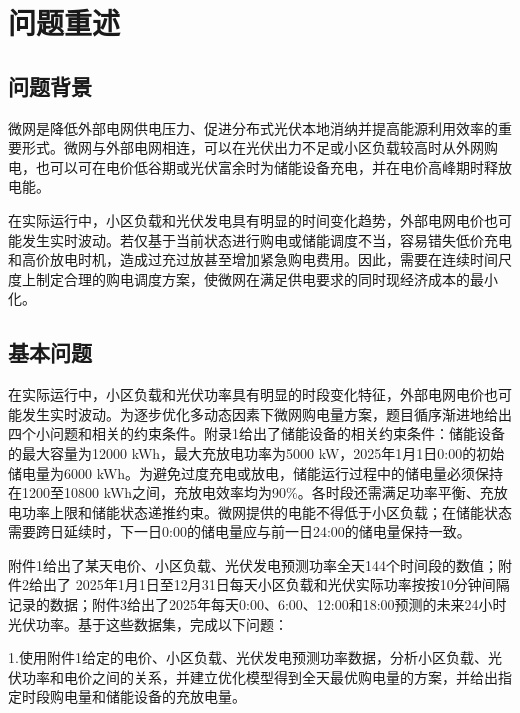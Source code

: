 \documentclass{cumcm2026}
\begin{document}
\label{cumcm:body-start}


\section{问题重述}

\subsection{问题背景}

微网是降低外部电网供电压力、促进分布式光伏本地消纳并提高能源利用效率的重要形式。微网与外部电网相连，可以在光伏出力不足或小区负载较高时从外网购电，也可以可在电价低谷期或光伏富余时为储能设备充电，并在电价高峰期时释放电能。

在实际运行中，小区负载和光伏发电具有明显的时间变化趋势，外部电网电价也可能发生实时波动。若仅基于当前状态进行购电或储能调度不当，容易错失低价充电和高价放电时机，造成过充过放甚至增加紧急购电费用\cite{wang2010distributed}。因此，需要在连续时间尺度上制定合理的购电调度方案，使微网在满足供电要求的同时现经济成本的最小化。


\subsection{基本问题}
在实际运行中，小区负载和光伏功率具有明显的时段变化特征，外部电网电价也可能发生实时波动。为逐步优化多动态因素下微网购电量方案，题目循序渐进地给出四个小问题和相关的约束条件。附录1给出了储能设备的相关约束条件：储能设备的最大容量为12000 kWh，最大充放电功率为5000 kW，2025年1月1日0:00的初始储电量为6000 kWh。为避免过度充电或放电，储能运行过程中的储电量必须保持在1200至10800 kWh之间，充放电效率均为90\%。各时段还需满足功率平衡、充放电功率上限和储能状态递推约束。微网提供的电能不得低于小区负载；在储能状态需要跨日延续时，下一日0:00的储电量应与前一日24:00的储电量保持一致。

附件1给出了某天电价、小区负载、光伏发电预测功率全天144个时间段的数值；附件2给出了
2025年1月1日至12月31日每天小区负载和光伏实际功率按按10分钟间隔记录的数据；附件3给出了2025年每天0:00、6:00、12:00和18:00预测的未来24小时光伏功率。基于这些数据集，完成以下问题：

1.使用附件1给定的电价、小区负载、光伏发电预测功率数据，分析小区负载、光伏功率和电价之间的关系，并建立优化模型得到全天最优购电量的方案，并给出指定时段购电量和储能设备的充放电量。
\end{document}
